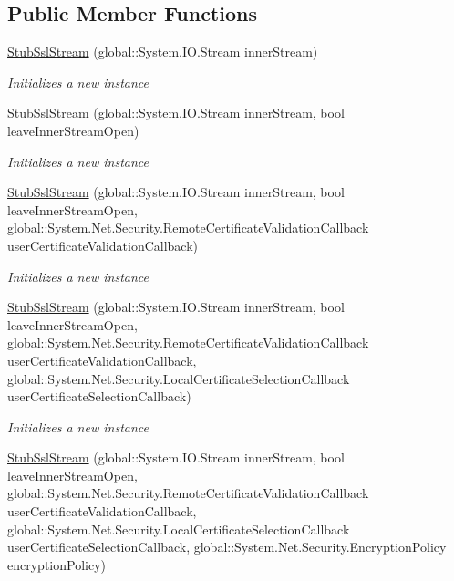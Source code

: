\subsection*{Public Member Functions}
\begin{DoxyCompactItemize}
\item 
\hyperlink{class_system_1_1_net_1_1_security_1_1_fakes_1_1_stub_ssl_stream_a775c9e42bb7f60a64a1301d6fd4d1122}{Stub\-Ssl\-Stream} (global\-::\-System.\-I\-O.\-Stream inner\-Stream)
\begin{DoxyCompactList}\small\item\em Initializes a new instance\end{DoxyCompactList}\item 
\hyperlink{class_system_1_1_net_1_1_security_1_1_fakes_1_1_stub_ssl_stream_a9413329f358d39b9d3d1513f1f44f48a}{Stub\-Ssl\-Stream} (global\-::\-System.\-I\-O.\-Stream inner\-Stream, bool leave\-Inner\-Stream\-Open)
\begin{DoxyCompactList}\small\item\em Initializes a new instance\end{DoxyCompactList}\item 
\hyperlink{class_system_1_1_net_1_1_security_1_1_fakes_1_1_stub_ssl_stream_a1e415703e9332f1edea1d00c6bf217a2}{Stub\-Ssl\-Stream} (global\-::\-System.\-I\-O.\-Stream inner\-Stream, bool leave\-Inner\-Stream\-Open, global\-::\-System.\-Net.\-Security.\-Remote\-Certificate\-Validation\-Callback user\-Certificate\-Validation\-Callback)
\begin{DoxyCompactList}\small\item\em Initializes a new instance\end{DoxyCompactList}\item 
\hyperlink{class_system_1_1_net_1_1_security_1_1_fakes_1_1_stub_ssl_stream_a51d589daab895e45e96bcc3c08685e51}{Stub\-Ssl\-Stream} (global\-::\-System.\-I\-O.\-Stream inner\-Stream, bool leave\-Inner\-Stream\-Open, global\-::\-System.\-Net.\-Security.\-Remote\-Certificate\-Validation\-Callback user\-Certificate\-Validation\-Callback, global\-::\-System.\-Net.\-Security.\-Local\-Certificate\-Selection\-Callback user\-Certificate\-Selection\-Callback)
\begin{DoxyCompactList}\small\item\em Initializes a new instance\end{DoxyCompactList}\item 
\hyperlink{class_system_1_1_net_1_1_security_1_1_fakes_1_1_stub_ssl_stream_a5edf3c709ff8c3975cfe3aaf98abffe3}{Stub\-Ssl\-Stream} (global\-::\-System.\-I\-O.\-Stream inner\-Stream, bool leave\-Inner\-Stream\-Open, global\-::\-System.\-Net.\-Security.\-Remote\-Certificate\-Validation\-Callback user\-Certificate\-Validation\-Callback, global\-::\-System.\-Net.\-Security.\-Local\-Certificate\-Selection\-Callback user\-Certificate\-Selection\-Callback, global\-::\-System.\-Net.\-Security.\-Encryption\-Policy encryption\-Policy)

\end{DoxyCompactItemize}
